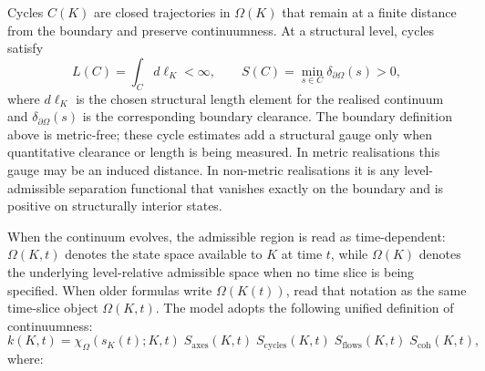 Cycles \(C(K)\) are closed trajectories in \(\Omega(K)\) that remain at a finite distance from the boundary and preserve continuumness.
At a structural level, cycles satisfy
\[
    L(C) = \int_C d\ell_K < \infty,\qquad
    S(C) = \min_{s \in C} \delta_{\partial\Omega}(s) > 0,
\]
where \(d\ell_K\) is the chosen structural length element for the realised
continuum and \(\delta_{\partial\Omega}(s)\) is the corresponding boundary
clearance.
The boundary definition above is metric-free; these cycle estimates add a
structural gauge only when quantitative clearance or length is being measured.
In metric realisations this gauge may be an induced distance. In non-metric
realisations it is any level-admissible separation functional that vanishes
exactly on the boundary and is positive on structurally interior states.

When the continuum evolves, the admissible region is read as time-dependent:
\(\Omega(K,t)\) denotes the state space available to \(K\) at time \(t\), while
\(\Omega(K)\) denotes the underlying level-relative admissible space when no
time slice is being specified.
When older formulas write \(\Omega(K(t))\), read that notation as the same
time-slice object \(\Omega(K,t)\).
The model adopts the following unified definition of continuumness:
\[
    k(K,t)
    = \chi_{\Omega}(s_K(t);K,t)\;
      S_{\mathrm{axes}}(K,t)\;
      S_{\mathrm{cycles}}(K,t)\;
      S_{\mathrm{flows}}(K,t)\;
      S_{\mathrm{coh}}(K,t),
\]
where:
